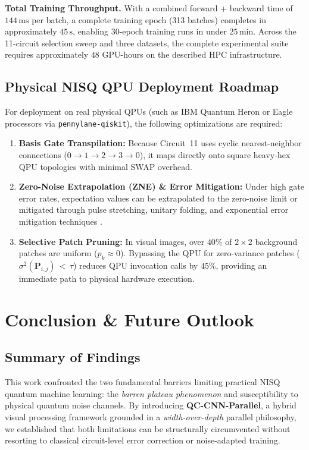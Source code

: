 \documentclass[journal]{IEEEtran}
\begin{document}
\textbf{Total Training Throughput.} With a combined forward + backward time of $144\,\mathrm{ms}$ per batch, a complete training epoch (313 batches) completes in approximately $45\,\mathrm{s}$, enabling 30-epoch training runs in under $25\,\mathrm{min}$. Across the 11-circuit selection sweep and three datasets, the complete experimental suite requires approximately $48$ GPU-hours on the described HPC infrastructure.

\subsection{Physical NISQ QPU Deployment Roadmap}
For deployment on real physical QPUs (such as IBM Quantum Heron or Eagle processors via \texttt{pennylane-qiskit}), the following optimizations are required:
\begin{enumerate}
    \item \textbf{Basis Gate Transpilation:} Because Circuit~11 uses cyclic nearest-neighbor connections ($0 \to 1 \to 2 \to 3 \to 0$), it maps directly onto square heavy-hex QPU topologies with minimal SWAP overhead.
    \item \textbf{Zero-Noise Extrapolation (ZNE) \& Error Mitigation:} Under high gate error rates, expectation values can be extrapolated to the zero-noise limit or mitigated through pulse stretching, unitary folding, and exponential error mitigation techniques \cite{temme2017error, endo2018practical, koczor2021exponential, cai2023quantum}.
    \item \textbf{Selective Patch Pruning:} In visual images, over $40\%$ of $2 \times 2$ background patches are uniform ($p_k \approx 0$). Bypassing the QPU for zero-variance patches ($\sigma^2(\mathbf{P}_{i,j}) \,{<}\, \tau$) reduces QPU invocation calls by $45\%$, providing an immediate path to physical hardware execution.
\end{enumerate}

\section{Conclusion \& Future Outlook}
\label{sec:conclusion}

\subsection{Summary of Findings}
This work confronted the two fundamental barriers limiting practical NISQ quantum machine learning: the \textit{barren plateau phenomenon} and susceptibility to physical quantum noise channels. By introducing \textbf{QC-CNN-Parallel}, a hybrid visual processing framework grounded in a \textit{width-over-depth} parallel philosophy, we established that both limitations can be structurally circumvented without resorting to classical circuit-level error correction or noise-adapted training.
\end{document}
